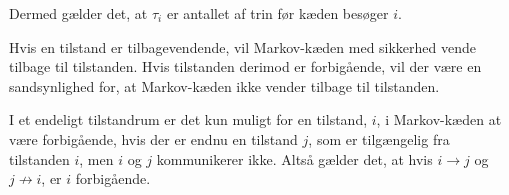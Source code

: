 Dermed gælder det, at $\tau_i$ er antallet af trin før kæden besøger $i$.

Hvis en tilstand er tilbagevendende, vil Markov-kæden med sikkerhed vende tilbage til tilstanden. Hvis tilstanden derimod er forbigående, vil der være en sandsynlighed for, at Markov-kæden ikke vender tilbage til tilstanden. 



I et endeligt tilstandrum er det kun muligt for en tilstand, $i$, i Markov-kæden at være forbigående, hvis der er endnu en tilstand $j$, som er tilgængelig fra tilstanden $i$, men $i$ og $j$ kommunikerer ikke. Altså gælder det, at hvis $i \to j$ og $j \not\to i$, er $i$ forbigående.








